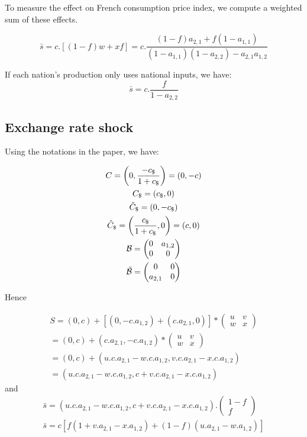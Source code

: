 \documentclass[11pt,a4paper]{article}
\begin{document}
To measure the effect on French consumption price index, we compute a weighted sum of these effects.

\begin{equation}
\bar{s}=c.\left[\left(1-f\right)w+xf\right]=c.\frac{\left(1-f\right)a_{2,1}+f\left(1-a_{1,1}\right)}{\left(1-a_{1,1}\right)\left(1-a_{2,2}\right)-a_{2,1}a_{1,2}}
\end{equation}

If each nation's production only uses national inputs, we have:
\begin{equation*}
\bar{s}=c.\frac{f}{1-a_{2,2}}
\end{equation*}

\subsection{Exchange rate shock}

Using the notations in the paper, we have:

\begin{gather*}
C=\left(0,\frac{-c_\$}{1+c_\$}\right)=\left(0,-c\right)
\\
C_\$=\left(c_\$,0\right)
\\
\tilde{C}_\$=\left(0,-c_\$\right)
\\
\hat{C}_\$=\left(\frac{c_\$}{1+c_\$},0\right)=\left(c,0\right)
\\
{\cal B} = \left(\begin{matrix}0&a_{1,2}\\0&0\end{matrix}\right)
\\
\tilde{\cal B} = \left(\begin{matrix}0&0\\a_{2,1}&0\end{matrix}\right)
\end{gather*}

Hence

\begin{gather*}
S =\left(0,c\right)+\left[\left(0,-c.a_{1,2}\right)+\left(c.a_{2,1},0\right)\right]*\left(\begin{matrix}u&v\\w&x\end{matrix}\right)
\\
=\left(0,c\right)+\left(c.a_{2,1},-c.a_{1,2}\right)*\left(\begin{matrix}u&v\\w&x\end{matrix}\right)
\\
=\left(0,c\right)+\left(u.c.a_{2,1}-w.c.a_{1,2},v.c.a_{2,1}-x.c.a_{1,2}\right)
\\
=\left(u.c.a_{2,1}-w.c.a_{1,2},c+v.c.a_{2,1}-x.c.a_{1,2}\right)
\end{gather*}
and
\begin{gather*}
\bar{s}=\left(u.c.a_{2,1}-w.c.a_{1,2},c+v.c.a_{2,1}-x.c.a_{1,2}\right).\left(\begin{matrix}1-f\\f\end{matrix}\right)
\\
\bar{s}=c\left[f\left(1+v.a_{2,1}-x.a_{1,2}\right)+\left(1-f\right)\left(u.a_{2,1}-w.a_{1,2}\right)\right]
\end{gather*}
\end{document}
